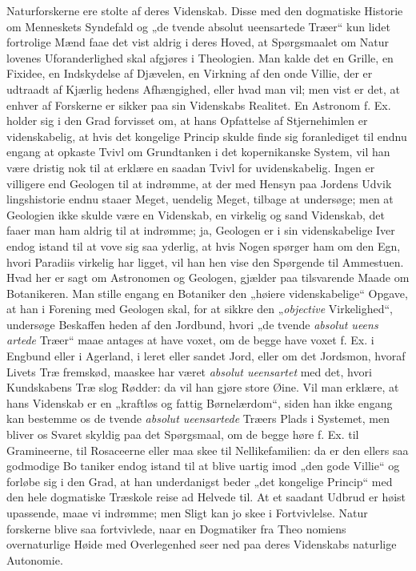 \documentclass[12pt]{book}
\newcommand{\opage}[1]{\marginnote{\footnotesize\textit{[#1]}}}
\begin{document}
Naturforskerne ere stolte af deres Videnskab. Disse med
den dogmatiske Historie om Menneskets Syndefald og „de tvende
absolut ueensartede Træer“ kun lidet fortrolige Mænd faae
det vist aldrig i deres Hoved, at Spørgsmaalet om Natur\-%
lovenes Uforanderlighed skal afgjøres i Theologien. Man
kalde det en Grille, en Fixidee, en Indskydelse af Djævelen,
en Virkning af den onde Villie, der er udtraadt af Kjærlig\-%
\opage{20}\setcounter{footnote}{0}%
hedens Afhængighed, eller hvad man vil; men vist er det, at
enhver af Forskerne er sikker paa sin Videnskabs Realitet.
En Astronom f. Ex. holder sig i den Grad forvisset om, at
hans Opfattelse af Stjernehimlen er videnskabelig, at hvis
det kongelige Princip skulde finde sig foranlediget til endnu
engang at opkaste Tvivl om Grundtanken i det kopernikanske
System, vil han være dristig nok til at erklære en saadan
Tvivl for uvidenskabelig. Ingen er villigere end Geologen
til at indrømme, at der med Hensyn paa Jordens Udvik\-%
lingshistorie endnu staaer Meget, uendelig Meget, tilbage at
undersøge; men at Geologien ikke skulde være en Videnskab,
en virkelig og sand Videnskab, det faaer man ham aldrig til
at indrømme; ja, Geologen er i sin videnskabelige Iver endog
istand til at vove sig saa yderlig, at hvis Nogen spørger ham
om den Egn, hvori Paradiis virkelig har ligget, vil han hen\-%
vise den Spørgende til Ammestuen. Hvad her er sagt om
Astronomen og Geologen, gjælder paa tilsvarende Maade om
Botanikeren. Man stille engang en Botaniker den „høiere
videnskabelige“ Opgave, at han i Forening med Geologen skal,
for at sikkre den „\emph{objective} Virkelighed“, undersøge Beskaffen\-%
heden af den Jordbund, hvori „de tvende \emph{absolut ueens\-%
artede} Træer“ maae antages at have voxet, om de begge
have voxet f. Ex. i Engbund eller i Agerland, i leret eller
sandet Jord, eller om det Jordsmon, hvoraf Livets Træ
fremskød, maaskee har været \emph{absolut ueensartet} med det,
hvori Kundskabens Træ slog Rødder: da vil han gjøre store
Øine. Vil man erklære, at hans Videnskab er en „kraftløs
og fattig Børnelærdom“, siden han ikke engang kan bestemme
os de tvende \emph{absolut ueensartede} Træers Plads i Systemet,
men bliver os Svaret skyldig paa det Spørgsmaal, om de
begge høre f. Ex. til Gramineerne, til Rosaceerne eller maa\-%
skee til Nellikefamilien: da er den ellers saa godmodige Bo\-%
taniker endog istand til at blive uartig imod „den gode
Villie“ og forløbe sig i den Grad, at han underdanigst beder
\opage{21}\setcounter{footnote}{0}%
„det kongelige Princip“ med den hele dogmatiske Træskole reise ad
Helvede til. At et saadant Udbrud er høist upassende, maae
vi indrømme; men Sligt kan jo skee i Fortvivlelse. Natur\-%
forskerne blive saa fortvivlede, naar en Dogmatiker fra Theo\-%
nomiens overnaturlige Høide med Overlegenhed seer ned paa
deres Videnskabs naturlige Autonomie.
\end{document}
